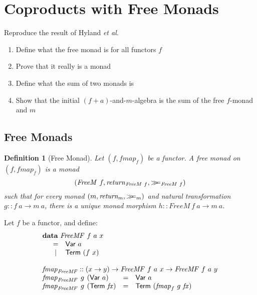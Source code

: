\documentclass{jfp1}
\newcommand{\mbind}{\mathrel{>\kern-0.45em>\kern-0.45em=}}
\newtheorem{definition}{Definition}
\newcommand{\kw}[1]{\textbf{#1}}
\begin{document}
\newpage
\appendix

\section{Coproducts with Free Monads}

Reproduce the result of Hyland \emph{et al.}

\begin{enumerate}
\item Define what the free monad is for all functors $f$
\item Prove that it really is a monad
\item Define what the sum of two monads is
\item Show that the initial $(f + a)$-and-$m$-algebra is the sum of
  the free $f$-monad and $m$
\end{enumerate}

\subsection{Free Monads}

\begin{definition}[Free Monad]
  Let $(f, \mathit{fmap}_f)$ be a functor. A free monad on
  $(f,\mathit{fmap}_f)$ is a monad
  \begin{displaymath}
    (\mathit{FreeM}~f, \mathit{return}_{\mathit{FreeM}~f}, \mbind_{\mathit{FreeM}~f})
  \end{displaymath}
  such that for every monad $(m, \mathit{return_m}, \mbind_m)$ and
  natural transformation $g :: f~a \to m~a$, there is a unique monad
  morphism $h :: \mathit{FreeM}~f~a \to m~a$.
\end{definition}

Let $f$ be a functor, and define:
\begin{displaymath}
    \begin{array}{l}
      \kw{data}~\mathit{FreeMF}~f~a~x \\
      \quad\begin{array}{cl}
        = & \mathsf{Var}~a \\
        | & \mathsf{Term}~(f~x)
      \end{array} \\
      \\
      \mathit{fmap}_{\mathit{FreeMF}} :: (x \to y) \to \mathit{FreeMF}~f~a~x \to \mathit{FreeMF}~f~a~y \\
      \begin{array}{@{}l@{\hspace{0.4em}}l@{\hspace{0.4em}}lcl}
        \mathit{fmap}_{\mathit{FreeMF}} & g & (\mathsf{Var}~a) & = & \mathsf{Var}~a \\
        \mathit{fmap}_{\mathit{FreeMF}} & g & (\mathsf{Term}~\mathit{fx}) & = & \mathsf{Term}~(\mathit{fmap}_f~g~\mathit{fx})
    \end{array}
  \end{array}
\end{displaymath}
\end{document}
